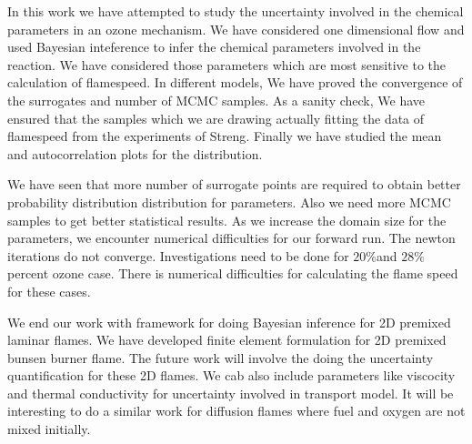  In this work we have attempted to study the uncertainty involved in the chemical parameters in an ozone mechanism. We have considered one dimensional flow and used Bayesian inteference to infer the chemical parameters involved in the reaction. We have considered those parameters which are most sensitive to the calculation of flamespeed. In different models, We have proved the convergence of the surrogates and  number of MCMC samples. As a sanity check, We have ensured that the samples which we are drawing actually fitting the data of flamespeed from the experiments of Streng\cite{Streng}. Finally we have studied the mean and autocorrelation plots for the distribution.


 We have seen that more number of surrogate points are required to obtain better probability distribution distribution for parameters. Also we need more MCMC samples to get better statistical results. As we increase the domain size for the parameters, we encounter numerical difficulties for our forward run. The newton iterations do not converge. Investigations need to be done for $20 \% $and $ 28 \% $ percent ozone case. There is numerical difficulties for calculating the flame speed for these cases.

 We end our work with  framework for doing Bayesian inference for 2D premixed laminar flames. We have developed finite element formulation for 2D premixed bunsen burner flame. The future work will involve the doing the uncertainty quantification for these 2D flames. We cab also include parameters like viscocity and  thermal conductivity for uncertainty involved in transport model. It will be interesting to do a similar work for diffusion flames where fuel and oxygen are not mixed initially.


